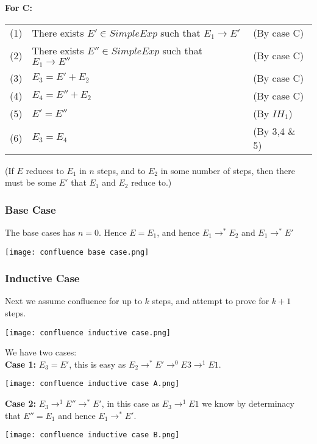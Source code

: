 \documentclass{report}
\begin{document}
                \textbf{For C:}
                \begin{center}
                    \begin{tabular}{l l l}
                        (1) & There exists $E' \in SimpleExp$ such that $E_1 \to E'$ & (By case C) \\
                        (2) & There exists $E'' \in SimpleExp$ such that $E_1 \to E''$ & (By case C) \\
                        (3) & $E_3 = E' + E_2$ & (By case C) \\
                        (4) & $E_4 = E'' + E_2$ & (By case C) \\
                        (5) & $E' = E''$ & (By $IH_1$) \\
                        (6) & $E_3 = E_4$ & (By 3,4 \& 5)
                    \end{tabular}
                \end{center}
            (If $E$ reduces to $E_1$ in $n$ steps, and to $E_2$ in some number of steps, then there must be some $E'$ that $E_1$ and $E_2$ reduce to.)
            \subsubsection*{Base Case}
                The base cases has $n=0$. Hence $E = E_1$, and hence $E_1 \to^* E_2$ and $E_1 \to^* E'$
                \begin{center}
                    \texttt{[image: confluence base case.png]}
                \end{center}
            \subsubsection*{Inductive Case}
                Next we assume confluence for up to $k$ steps, and attempt to prove for $k+1$ steps.
                \begin{center}
                    \texttt{[image: confluence inductive case.png]}
                \end{center}
                We have two cases:
                \\ \textbf{Case 1:} $E_3 = E'$, this is easy as $E_2 \to^* E' \to^0 E3 \to^1 E1$.
                \begin{center}
                    \texttt{[image: confluence inductive case A.png]}
                \end{center}
                \textbf{Case 2:} $E_3 \to^1 E'' \to^* E'$, in this case as $E_3 \to^1 E1$ we know by determinacy that $E'' = E_1$ and hence $E_1 \to^* E'$.
                \begin{center}
                    \texttt{[image: confluence inductive case B.png]}
                \end{center}
\end{document}
